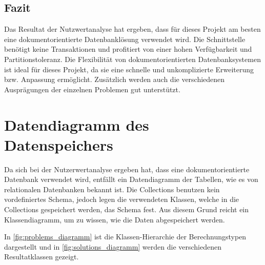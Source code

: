 \FloatBarrier
\subsection{Fazit}\label{architektur_fazit}
Das Resultat der Nutzwertanalyse hat ergeben, dass für dieses Projekt am besten eine dokumentorientierte Datenbanklösung verwendet wird.
Die Schnittstelle benötigt keine Transaktionen und profitiert von einer hohen Verfügbarkeit und Partitionstoleranz. Die Flexibilität
von dokumentorientierten Datenbanksystemen ist ideal für dieses Projekt, da sie eine schnelle und unkomplizierte Erweiterung bzw. Anpassung ermöglicht. Zusätzlich werden 
auch die verschiedenen Ausprägungen der einzelnen Problemen gut unterstützt.

\section{Datendiagramm des Datenspeichers}\label{datendiagramm_datenspeicher}
Da sich bei der Nutzerwertanalyse ergeben hat, dass eine dokumentorientierte Datenbank verwendet wird, entfällt ein Datendiagramm der Tabellen, wie es von relationalen Datenbanken 
bekannt ist. Die Collections benutzen kein vordefiniertes Schema, jedoch legen die verwendeten Klassen, welche in die Collections gespeichert werden, das Schema fest. Aus diesem Grund 
reicht ein Klassendiagramm, um zu wissen, wie die Daten abgespeichert werden.

In \autoref{fig:problems_diagramm} ist die Klassen-Hierarchie der Berechnungstypen dargestellt und in \autoref{fig:solutions_diagramm} werden die verschiedenen 
Resultatklassen gezeigt.


